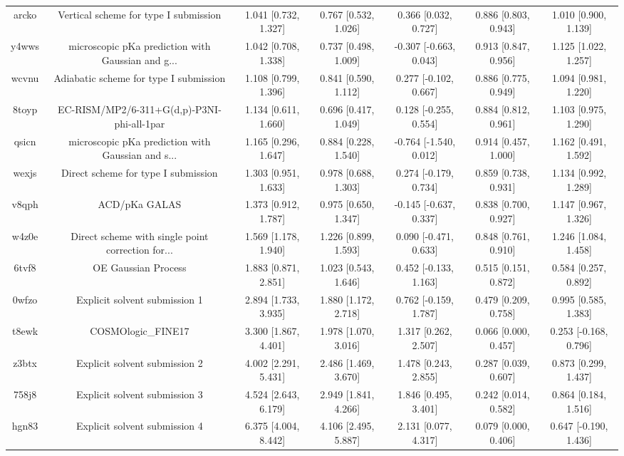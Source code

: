 \documentclass{article}
\begin{document}
\begin{center}
\begin{longtable}{|ccccccc|}
 arcko &              Vertical scheme for type I submission &  1.041 [0.732, 1.327] &  0.767 [0.532, 1.026] &     0.366 [0.032, 0.727] &  0.886 [0.803, 0.943] &   1.010 [0.900, 1.139] \\
 y4wws &  microscopic pKa prediction with Gaussian and g... &  1.042 [0.708, 1.338] &  0.737 [0.498, 1.009] &   -0.307 [-0.663, 0.043] &  0.913 [0.847, 0.956] &   1.125 [1.022, 1.257] \\
 wcvnu &             Adiabatic scheme for type I submission &  1.108 [0.799, 1.396] &  0.841 [0.590, 1.112] &    0.277 [-0.102, 0.667] &  0.886 [0.775, 0.949] &   1.094 [0.981, 1.220] \\
 8toyp &         EC-RISM/MP2/6-311+G(d,p)-P3NI-phi-all-1par &  1.134 [0.611, 1.660] &  0.696 [0.417, 1.049] &    0.128 [-0.255, 0.554] &  0.884 [0.812, 0.961] &   1.103 [0.975, 1.290] \\
 qsicn &  microscopic pKa prediction with Gaussian and s... &  1.165 [0.296, 1.647] &  0.884 [0.228, 1.540] &   -0.764 [-1.540, 0.012] &  0.914 [0.457, 1.000] &   1.162 [0.491, 1.592] \\
 wexjs &                Direct scheme for type I submission &  1.303 [0.951, 1.633] &  0.978 [0.688, 1.303] &    0.274 [-0.179, 0.734] &  0.859 [0.738, 0.931] &   1.134 [0.992, 1.289] \\
 v8qph &                                      ACD/pKa GALAS &  1.373 [0.912, 1.787] &  0.975 [0.650, 1.347] &   -0.145 [-0.637, 0.337] &  0.838 [0.700, 0.927] &   1.147 [0.967, 1.326] \\
 w4z0e &  Direct scheme with single point correction for... &  1.569 [1.178, 1.940] &  1.226 [0.899, 1.593] &    0.090 [-0.471, 0.633] &  0.848 [0.761, 0.910] &   1.246 [1.084, 1.458] \\
 6tvf8 &                                OE Gaussian Process &  1.883 [0.871, 2.851] &  1.023 [0.543, 1.646] &    0.452 [-0.133, 1.163] &  0.515 [0.151, 0.872] &   0.584 [0.257, 0.892] \\
 0wfzo &                      Explicit solvent submission 1 &  2.894 [1.733, 3.935] &  1.880 [1.172, 2.718] &    0.762 [-0.159, 1.787] &  0.479 [0.209, 0.758] &   0.995 [0.585, 1.383] \\
 t8ewk &                                 COSMOlogic\_FINE17 &  3.300 [1.867, 4.401] &  1.978 [1.070, 3.016] &     1.317 [0.262, 2.507] &  0.066 [0.000, 0.457] &  0.253 [-0.168, 0.796] \\
 z3btx &                      Explicit solvent submission 2 &  4.002 [2.291, 5.431] &  2.486 [1.469, 3.670] &     1.478 [0.243, 2.855] &  0.287 [0.039, 0.607] &   0.873 [0.299, 1.437] \\
 758j8 &                      Explicit solvent submission 3 &  4.524 [2.643, 6.179] &  2.949 [1.841, 4.266] &     1.846 [0.495, 3.401] &  0.242 [0.014, 0.582] &   0.864 [0.184, 1.516] \\
 hgn83 &                      Explicit solvent submission 4 &  6.375 [4.004, 8.442] &  4.106 [2.495, 5.887] &     2.131 [0.077, 4.317] &  0.079 [0.000, 0.406] &  0.647 [-0.190, 1.436] \\
\end{longtable}
\end{center}
\end{document}
